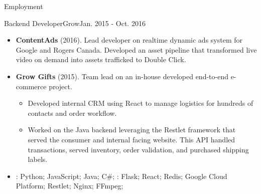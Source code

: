 \documentclass[]{mcdowellcv}
\begin{document}
\begin{cvsection}{Employment}
        \begin{cvsubsection}{Backend Developer}{Grow}{Jan. 2015 - Oct. 2016}
            \begin{itemize}
                \item \textbf{ContentAds} (2016). Lead developer on realtime dynamic ads system for Google and Rogers Canada. Developed an asset pipeline that transformed live video on demand into assets trafficked to Double Click.
            \end{itemize}
            \begin{itemize}
                \item \textbf{Grow Gifts} (2015). Team lead on an in-house developed end-to-end e-commerce project. 
                    \begin{itemize}
                         \item Developed internal CRM using React to manage logistics for hundreds of contacts and order workflow.
                         \item Worked on the Java backend leveraging the Restlet framework that served the consumer and internal facing website. This API handled transactions, served inventory, order validation, and purchased shipping labels.
                    \end{itemize}
            \end{itemize}
            \begin{itemize}
                 \item {}: Python; JavaScript; Java; C\#; \newline
                : Flask; React; Redis; Google Cloud Platform; Restlet; Nginx; FFmpeg;
            \end{itemize}
        \end{cvsubsection}
        \pagebreak


\end{cvsection}
\end{document}
